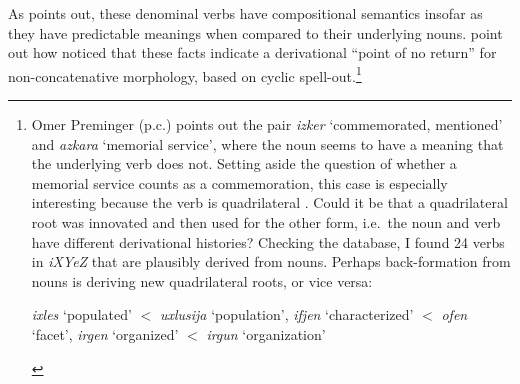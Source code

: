 \begin{exe}
\begin{xlist}
\begin{exe}
\begin{xlist}
\begin{exe}
\begin{exe}
\begin{xlist}
\begin{exe}
\begin{exe}
\begin{xlist}
\begin{exe}
\begin{xlist}
\begin{exe}
\begin{xlist}
\begin{exe}
\begin{xlist}
\begin{exe}
\begin{xlist}
\begin{xlist}
\begin{exe}
\begin{xlist}
\begin{exe}
\begin{xlist}
\begin{exe}
\begin{exe}
\begin{exe}
\begin{xlist}
\begin{exe}
\begin{exe}
\begin{xlist}
\begin{exe}
\begin{xlist}
\begin{exe}
\begin{xlist}
\begin{exe}
\begin{xlist}
\begin{xlist}
\begin{exe}
\begin{xlist}
\begin{exe}
\begin{xlist}
\begin{exe}
\begin{xlist}
\begin{exe}
\begin{xlist}
\begin{exe}
\begin{exe}
\begin{exe}
\begin{exe}
\begin{exe}
\begin{xlist}
\begin{xlist}
\begin{exe}
\begin{xlist}
\begin{exe}
\begin{xlist}
\begin{exe}
\begin{exe}
\begin{exe}
\begin{xlist}
\begin{exe}
\begin{xlist}
\begin{exe}
\begin{xlist}
\begin{exe}
\begin{exe}
\begin{xlist}
\begin{exe}
\begin{exe}
\begin{exe}
\begin{xlist}
\begin{xlist}
\begin{exe}
\begin{exe}
\begin{exe}
\begin{xlist}
\begin{exe}
\begin{xlist}
\begin{exe}
\begin{xlist}
As \cite{arad03} points out, these denominal verbs have compositional semantics insofar as they have predictable meanings when compared to their underlying nouns. \cite{kastnertucker19cup} point out how \citeauthor{arad03} noticed that these facts indicate a derivational ``point of no return'' for non-concatenative morphology, based on cyclic spell-out.\footnote{Omer Preminger (p.c.) points out the pair \emph{izker} `commemorated, mentioned' and \emph{azkara} `memorial service', where the noun seems to have a meaning that the underlying verb does not. Setting aside the question of whether a memorial service counts as a commemoration, this case is especially interesting because the verb is quadrilateral \citep{schwarzwald16}. Could it be that a quadrilateral root  was innovated and then used for the other form, i.e.~the noun and verb have different derivational histories? Checking the database, I found 24 verbs in \emph{iXYeZ} that are plausibly derived from nouns. Perhaps back-formation from nouns is deriving new quadrilateral roots, or vice versa:
 \begin{exe}
 \ex  
 \begin{xlist} 
 	\ex  \emph{ixles} `populated' $<$ \emph{uxlusija} `population', \emph{ifjen} `characterized' $<$ \emph{ofen} `facet', \emph{irgen} `organized' $<$ \emph{irgun} `organization' 

\end{xlist}
\end{exe}}
\end{xlist}
\end{exe}
\end{xlist}
\end{exe}
\end{xlist}
\end{exe}
\end{exe}
\end{exe}
\end{xlist}
\end{xlist}
\end{exe}
\end{exe}
\end{exe}
\end{xlist}
\end{exe}
\end{exe}
\end{xlist}
\end{exe}
\end{xlist}
\end{exe}
\end{xlist}
\end{exe}
\end{exe}
\end{exe}
\end{xlist}
\end{exe}
\end{xlist}
\end{exe}
\end{xlist}
\end{xlist}
\end{exe}
\end{exe}
\end{exe}
\end{exe}
\end{exe}
\end{xlist}
\end{exe}
\end{xlist}
\end{exe}
\end{xlist}
\end{exe}
\end{xlist}
\end{exe}
\end{xlist}
\end{xlist}
\end{exe}
\end{xlist}
\end{exe}
\end{xlist}
\end{exe}
\end{xlist}
\end{exe}
\end{exe}
\end{xlist}
\end{exe}
\end{exe}
\end{exe}
\end{xlist}
\end{exe}
\end{xlist}
\end{exe}
\end{xlist}
\end{xlist}
\end{exe}
\end{xlist}
\end{exe}
\end{xlist}
\end{exe}
\end{xlist}
\end{exe}
\end{xlist}
\end{exe}
\end{exe}
\end{xlist}
\end{exe}
\end{exe}
\end{xlist}
\end{exe}
\end{xlist}
\end{exe}

